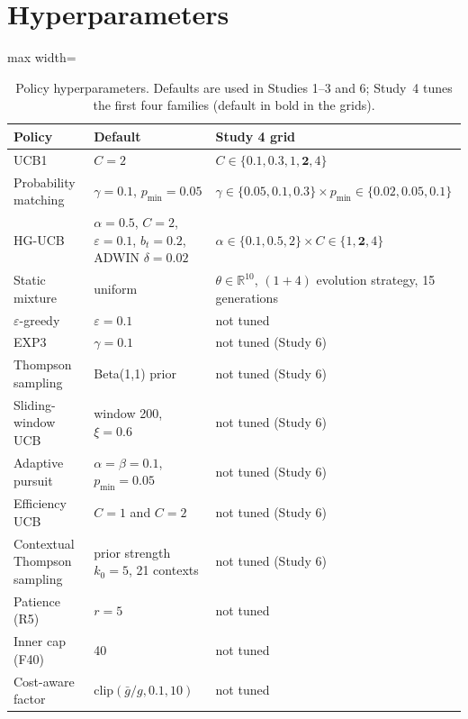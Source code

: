 \section{Hyperparameters}\label{app:hyper}
\setcounter{table}{0}
\begin{table}[h]
\caption{Policy hyperparameters. Defaults are used in Studies 1--3 and 6; Study~4 tunes the first four families (default in bold in the grids).}\label{tab:hyper}
\centering\small
\begin{adjustbox}{max width=\linewidth}
\begin{tabular}{lll}
\toprule
Policy & Default & Study 4 grid \\
\midrule
UCB1 & $C=2$ & $C\in\{0.1,0.3,1,\mathbf{2},4\}$ \\
Probability matching & $\gamma=0.1$, $p_{\min}=0.05$ & $\gamma\in\{0.05,\mathbf{0.1},0.3\}\times p_{\min}\in\{0.02,\mathbf{0.05},0.1\}$ \\
HG-UCB & $\alpha=0.5$, $C=2$, $\varepsilon=0.1$, $b_t=0.2$, ADWIN $\delta=0.02$ & $\alpha\in\{0.1,\mathbf{0.5},2\}\times C\in\{1,\mathbf{2},4\}$ \\
Static mixture & uniform & $\theta\in\mathbb{R}^{10}$, $(1{+}4)$ evolution strategy, 15 generations \\
$\varepsilon$-greedy & $\varepsilon=0.1$ & not tuned \\
EXP3 & $\gamma=0.1$ & not tuned (Study 6) \\
Thompson sampling & Beta(1,1) prior & not tuned (Study 6) \\
Sliding-window UCB & window 200, $\xi=0.6$ & not tuned (Study 6) \\
Adaptive pursuit & $\alpha=\beta=0.1$, $p_{\min}=0.05$ & not tuned (Study 6) \\
Efficiency UCB & $C=1$ and $C=2$ & not tuned (Study 6) \\
Contextual Thompson sampling & prior strength $k_0=5$, 21 contexts & not tuned (Study 6) \\
Patience (R5) & $r=5$ & not tuned \\
Inner cap (F40) & 40 & not tuned \\
Cost-aware factor & $\mathrm{clip}(\bar g/g,0.1,10)$ & not tuned \\
\bottomrule
\end{tabular}
\end{adjustbox}
\end{table}
